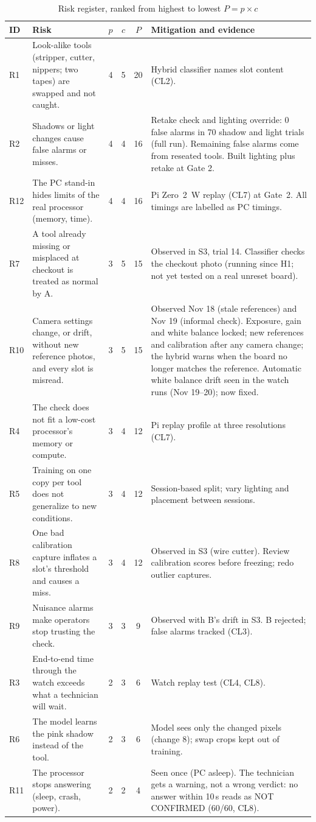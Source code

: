 \begin{table}[!t]
\centering
\footnotesize
\caption{Risk register, ranked from highest to lowest $P = p \times c$}
\label{tab:risks}
\begin{tabularx}{\textwidth}{@{}l Y c c c Y@{}}
\toprule
ID & Risk & $p$ & $c$ & $P$ & Mitigation and evidence \\
\midrule
R1 & Look-alike tools (stripper, cutter, nippers; two tapes) are swapped and not caught. & 4 & 5 & 20 & Hybrid classifier names slot content (CL2). \\
R2 & Shadows or light changes cause false alarms or misses. & 4 & 4 & 16 & Retake check and lighting override: 0 false alarms in 70 shadow and light trials (full run). Remaining false alarms come from reseated tools. Built lighting plus retake at Gate 2. \\
R12 & The PC stand-in hides limits of the real processor (memory, time). & 4 & 4 & 16 & Pi Zero~2~W replay (CL7) at Gate~2. All timings are labelled as PC timings. \\
R7 & A tool already missing or misplaced at checkout is treated as normal by A. & 3 & 5 & 15 & Observed in S3, trial 14. Classifier checks the checkout photo (running since H1; not yet tested on a real unreset board). \\
R10 & Camera settings change, or drift, without new reference photos, and every slot is misread. & 3 & 5 & 15 & Observed Nov 18 (stale references) and Nov 19 (informal check). Exposure, gain and white balance locked; new references and calibration after any camera change; the hybrid warns when the board no longer matches the reference. Automatic white balance drift seen in the watch runs (Nov 19--20); now fixed. \\
R4 & The check does not fit a low-cost processor's memory or compute. & 3 & 4 & 12 & Pi replay profile at three resolutions (CL7). \\
R5 & Training on one copy per tool does not generalize to new conditions. & 3 & 4 & 12 & Session-based split; vary lighting and placement between sessions. \\
R8 & One bad calibration capture inflates a slot's threshold and causes a miss. & 3 & 4 & 12 & Observed in S3 (wire cutter). Review calibration scores before freezing; redo outlier captures. \\
R9 & Nuisance alarms make operators stop trusting the check. & 3 & 3 & 9 & Observed with B's drift in S3. B rejected; false alarms tracked (CL3). \\
R3 & End-to-end time through the watch exceeds what a technician will wait. & 2 & 3 & 6 & Watch replay test (CL4, CL8). \\
R6 & The model learns the pink shadow instead of the tool. & 2 & 3 & 6 & Model sees only the changed pixels (change 8); swap crops kept out of training. \\
R11 & The processor stops answering (sleep, crash, power). & 2 & 2 & 4 & Seen once (PC asleep). The technician gets a warning, not a wrong verdict: no answer within 10\,s reads as NOT CONFIRMED (60/60, CL8). \\
\bottomrule
\end{tabularx}
\end{table}


